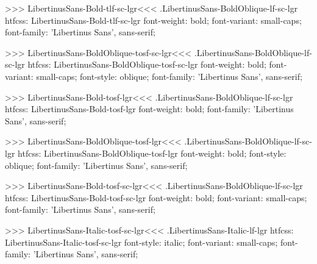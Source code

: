 >>>
\<LibertinusSans-Bold-tlf-sc-lgr\><<<
.LibertinusSans-BoldOblique-lf-sc-lgr
htfcss:  LibertinusSans-Bold-tlf-sc-lgr  font-weight: bold; font-variant: small-caps; font-family: 'Libertinus Sans', sans-serif;

>>>
\<LibertinusSans-BoldOblique-tosf-sc-lgr\><<<
.LibertinusSans-BoldOblique-lf-sc-lgr
htfcss:  LibertinusSans-BoldOblique-tosf-sc-lgr  font-weight: bold; font-variant: small-caps; font-style: oblique; font-family: 'Libertinus Sans', sans-serif;

>>>
\<LibertinusSans-Bold-tosf-lgr\><<<
.LibertinusSans-BoldOblique-lf-sc-lgr
htfcss:  LibertinusSans-Bold-tosf-lgr  font-weight: bold; font-family: 'Libertinus Sans', sans-serif;

>>>
\<LibertinusSans-BoldOblique-tosf-lgr\><<<
.LibertinusSans-BoldOblique-lf-sc-lgr
htfcss:  LibertinusSans-BoldOblique-tosf-lgr  font-weight: bold; font-style: oblique; font-family: 'Libertinus Sans', sans-serif;

>>>
\<LibertinusSans-Bold-tosf-sc-lgr\><<<
.LibertinusSans-BoldOblique-lf-sc-lgr
htfcss:  LibertinusSans-Bold-tosf-sc-lgr  font-weight: bold; font-variant: small-caps; font-family: 'Libertinus Sans', sans-serif;

>>>
\<LibertinusSans-Italic-tosf-sc-lgr\><<<
.LibertinusSans-Italic-lf-lgr
htfcss:  LibertinusSans-Italic-tosf-sc-lgr  font-style: italic; font-variant: small-caps; font-family: 'Libertinus Sans', sans-serif;

